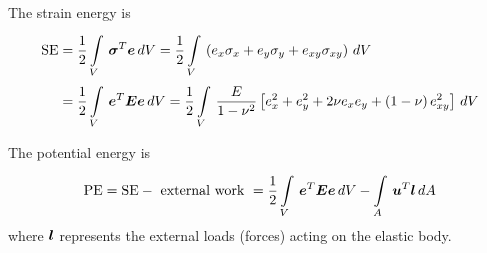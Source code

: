The strain energy is 
\begin{align*}
  \text{SE} &= \dfrac{1}{2} \goneint{\transpose{\vectr{\sigma}}\vectr{e}}{V} = \dfrac{1}{2}
  \goneint{\pbrac{e_{x}\sigma_{x} + e_{y}\sigma_{y} + e_{xy}\sigma_{xy}}}{V} \\ &=
  \dfrac{1}{2} \goneint{\transpose{\vectr{e}}\matr{E}\vectr{e}}{V} = \dfrac{1}{2}
  \goneint{\dfrac{E}{1-\nu^{2}} \sqbrac{e_{x}^{2} + e_{y}^{2} + 2\nu e_{x}e_{y} +
      \pbrac{1-\nu}e_{xy}^{2}}}{V}
\end{align*}

The potential energy is
\begin{equation}
  \text{PE} = \text{SE} -\text{ external work }= \dfrac{1}{2}
  \goneint{\transpose{\vectr{e}}\matr{E}\vectr{e}}{V} -
  \goneint{\transpose{\vectr{u}}\vectr{l}}{A} 
  \label{eqn:pe}
\end{equation}
where $\boldsymbol{l}$ represents the external loads (forces) acting on the elastic
body.


